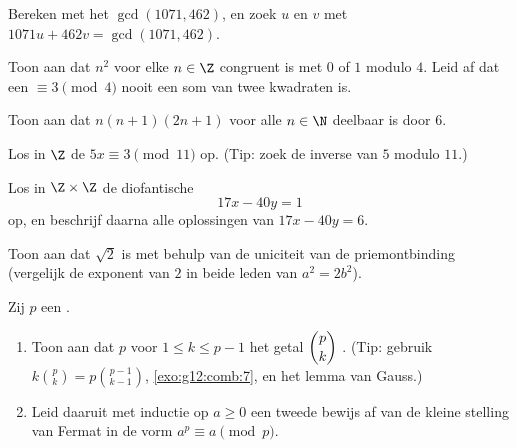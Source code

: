 \begin{exercise}[$\star$]\label{exo:g12:arith:3}
Bereken met het  $\gcd(1071, 462)$, en zoek  $u$ en $v$ met $1071u + 462v = \gcd(1071, 462)$.
\end{exercise}

\begin{exercise}[$\star$]\label{exo:g12:arith:4}
Toon aan dat $n^2$ voor elke $n \in \Z$ congruent is met $0$ of $1$ modulo
$4$. Leid af dat een  $\equiv 3 \pmod 4$ nooit een som van twee
kwadraten is.
\end{exercise}

\begin{exercise}[$\star\star$]\label{exo:g12:arith:5}
Toon aan dat $n(n+1)(2n+1)$ voor alle $n \in \N$ deelbaar is door $6$.
\end{exercise}

\begin{exercise}[$\star\star$]\label{exo:g12:arith:6}
Los in $\Z$ de  $5x \equiv 3 \pmod{11}$ op.
(Tip: zoek de inverse van $5$ modulo $11$.)
\end{exercise}

\begin{exercise}[$\star\star$]\label{exo:g12:arith:7}
Los in $\Z \times \Z$ de diofantische 
\[
17x - 40y = 1
\]
op, en beschrijf daarna alle oplossingen van $17x - 40y = 6$.
\end{exercise}

\begin{exercise}[$\star\star$]\label{exo:g12:arith:8}
Toon aan dat $\sqrt2$  is met behulp van de uniciteit van de
priemontbinding (vergelijk de exponent van $2$ in beide leden van
$a^2 = 2b^2$).
\end{exercise}

\begin{exercise}[$\star\star\star$]\label{exo:g12:arith:9}
Zij $p$ een .
\begin{enumerate}
  \item Toon aan dat $p$ voor $1 \leq k \leq p - 1$ het getal $\dbinom{p}{k}$
        . (Tip: gebruik $k\binom pk = p\binom{p-1}{k-1}$,
        \cref{exo:g12:comb:7}, en het lemma van Gauss.)
  \item Leid daaruit met inductie op $a \geq 0$ een tweede bewijs af van de
        kleine stelling van Fermat in de vorm $a^p \equiv a \pmod p$.
\end{enumerate}
\end{exercise}

